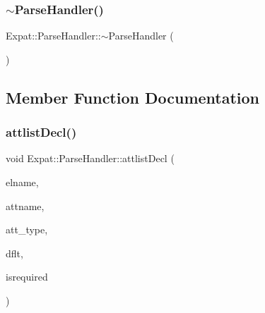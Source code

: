 \hypertarget{class_expat_1_1_parse_handler_a188f81926a657b5231fc4a60a5905701}{}\label{class_expat_1_1_parse_handler_a188f81926a657b5231fc4a60a5905701} 
\subsubsection{\texorpdfstring{$\sim$\+Parse\+Handler()}{~ParseHandler()}}
{\footnotesize\ttfamily Expat\+::\+Parse\+Handler\+::$\sim$\+Parse\+Handler (\begin{DoxyParamCaption}{ }\end{DoxyParamCaption})\hspace{0.3cm}{\ttfamily [virtual]}}



\subsection{Member Function Documentation}
\hypertarget{class_expat_1_1_parse_handler_aef520b46141f4c8249299470de092041}{}\label{class_expat_1_1_parse_handler_aef520b46141f4c8249299470de092041} 
\subsubsection{\texorpdfstring{attlist\+Decl()}{attlistDecl()}}
{\footnotesize\ttfamily void Expat\+::\+Parse\+Handler\+::attlist\+Decl (\begin{DoxyParamCaption}\item[{const X\+M\+L\+\_\+\+Char $\ast$}]{elname,  }\item[{const X\+M\+L\+\_\+\+Char $\ast$}]{attname,  }\item[{const X\+M\+L\+\_\+\+Char $\ast$}]{att\+\_\+type,  }\item[{const X\+M\+L\+\_\+\+Char $\ast$}]{dflt,  }\item[{int}]{isrequired }\end{DoxyParamCaption})\hspace{0.3cm}{\ttfamily [virtual]}}

\hypertarget{class_expat_1_1_parse_handler_af3f6effd1ab8b85ec007b981f83d130e}{}\label{class_expat_1_1_parse_handler_af3f6effd1ab8b85ec007b981f83d130e} 

